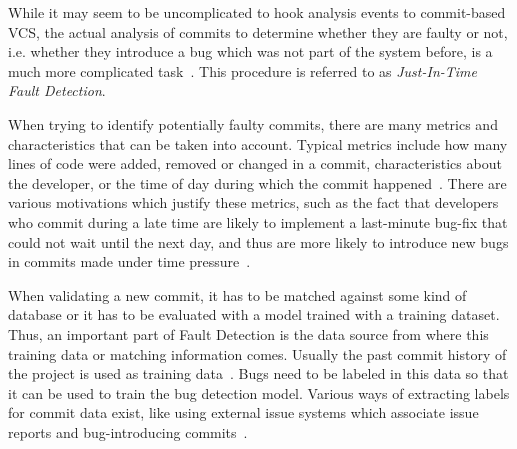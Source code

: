 While it may seem to be uncomplicated to hook analysis events to commit-based VCS, the actual analysis of commits to determine whether they are faulty or not, i.e. whether they introduce a bug which was not part of the system before, is a much more complicated task~\cite{Nayrolles2018, Kamei2013}. This procedure is referred to as \textit{Just-In-Time Fault Detection}.

When trying to identify potentially faulty commits, there are many metrics and characteristics that can be taken into account. Typical metrics include how many lines of code were added, removed or changed in a commit, characteristics about the developer, or the time of day during which the commit happened~\cite{Goyal2017}. There are various motivations which justify these metrics, such as the fact that developers who commit during a late time are likely to implement a last-minute bug-fix that could not wait until the next day, and thus are more likely to introduce new bugs in commits made under time pressure~\cite{Goyal2017}.


When validating a new commit, it has to be matched against some kind of database or it has to be evaluated with a model trained with a training dataset. Thus, an important part of Fault Detection is the data source from where this training data or matching information comes. Usually the past commit history of the project is used as training data~\cite{Kamei2013}.
Bugs need to be labeled in this data so that it can be used to train the bug detection model.
Various ways
of extracting labels for commit data exist, like using external issue systems which associate issue reports and bug-introducing commits~\cite{Nayrolles2018,Rosen2015}.


